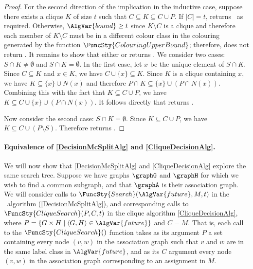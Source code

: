 \begin{proof}
  For the second direction of the implication in the inductive case, suppose there exists a clique
  $K$ of size $t$ such that $C \subseteq K \subseteq C \cup P$.  If $|C|=t$, 
  returns \boolT\ as required.  Otherwise, $\AlgVar{bound} \geq t$ since $K \setminus C$ is a clique
  and therefore each member of $K \setminus C$ must be in a different colour class in the colouring
    generated by the function $\FuncSty{ColouringUpperBound}$; therefore, 
    does not return \boolF.  It remains to show that either 
   or  returns \boolT. We consider two
  cases: $S \cap K \not= \emptyset$ and $S \cap K = \emptyset$.  In the first case, let $x$ be
  the unique element of $S \cap K$.  Since $C \subseteq K$ and $x \in K$, we have
  $C \cup \{x\} \subseteq K$.
  Since $K$ is a clique containing $x$, we have $K \subseteq \{x\} \cup N(x)$ and
    therefore $P \cap K \subseteq \{x\} \cup (P \cap N(x))$.
  Combining this with the fact that $K \subseteq C \cup P$,
  we have $K \subseteq C \cup \{x\} \cup (P \cap N(x))$.  It follows directly that 
  returns \boolT.

    Now consider the second case: $S \cap K = \emptyset$.  Since $K \subseteq C \cup P$,
    we have $K \subseteq C \cup (P \setminus S)$.  Therefore 
    returns \boolT.
\end{proof}

\paragraph{Equivalence of \cref{DecisionMcSplitAlg} and
\cref{CliqueDecisionAlg}.}  We will now show that \cref{DecisionMcSplitAlg} and
\cref{CliqueDecisionAlg} explore the same search tree.  Suppose we have graphs
$\graphG$ and $\graphH$ for which we wish to find a common subgraph, and that
$\graphA$ is their association graph.  We will consider calls to
$\FuncSty{Search}(\AlgVar{future},M,t)$ in the \McSplit\
algorithm (\cref{DecisionMcSplitAlg}), and corresponding calls to
$\FuncSty{CliqueSearch}(P,C,t)$ in the clique algorithm
\cref{CliqueDecisionAlg}, where $P = \{G \times H \mid \langle G,H \rangle \in
\AlgVar{future}\}$ and $C = M$.  That is, each call to the
$\FuncSty{CliqueSearch}()$ function takes as its argument $P$ a set containing
every node $(v,w)$ in the association graph such that $v$ and $w$ are in the
same label class in $\AlgVar{future}$, and as its $C$ argument every node
$(v,w)$ in the association graph corresponding to an assignment in $M$.

